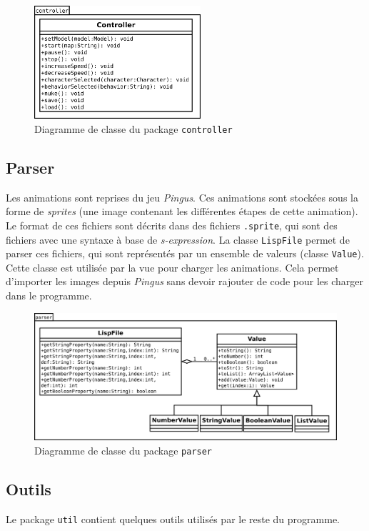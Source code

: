 \documentclass[a4paper,12pt]{article}
\begin{document}
\begin{figure}[ht!]
  \centerline{
  \includegraphics[width=0.55\textwidth]{controller.png}}
  \caption{Diagramme de classe du package \texttt{controller}}
\end{figure}

\subsection{Parser}
Les animations sont reprises du jeu \emph{Pingus}. Ces animations sont
stockées sous la forme de \emph{sprites} (une image contenant les
différentes étapes de cette animation). Le format de ces fichiers sont
décrits dans des fichiers \texttt{.sprite}, qui sont des fichiers avec
une syntaxe à base de \emph{s-expression}. La classe \texttt{LispFile}
permet de parser ces fichiers, qui sont représentés par un ensemble de
valeurs (classe \texttt{Value}). Cette classe est utilisée par la vue
pour charger les animations. Cela permet d'importer les images depuis
\emph{Pingus} sans devoir rajouter de code pour les charger dans le
programme.

\begin{figure}[ht!]
  \centerline{
  \includegraphics[width=\textwidth]{parser.png}}
  \caption{Diagramme de classe du package \texttt{parser}}
\end{figure}

\subsection{Outils}
Le package \texttt{util} contient quelques outils utilisés par le
reste du programme.\\
\end{document}
